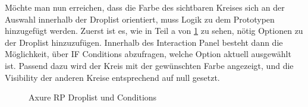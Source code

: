 Möchte man nun erreichen, dass die Farbe des sichtbaren Kreises sich an der Auswahl innerhalb der Droplist orientiert, muss Logik zu dem Prototypen hinzugefügt werden.
Zuerst ist es, wie in Teil a von \cref{fig:Droplist} zu sehen, nötig Optionen zu der Droplist hinzuzufügen.
Innerhalb des Interaction Panel besteht dann die Möglichkeit, über IF Conditions abzufragen, welche Option aktuell ausgewählt ist.
Passend dazu wird der Kreis mit der gewünschten Farbe angezeigt, und die Visibility der anderen Kreise entsprechend auf null gesetzt.

\begin{figure}%
\centering
{}%
\qquad
{}%

\caption{Axure RP Droplist und Conditions}%
\label{fig:Droplist}
\end{figure}

